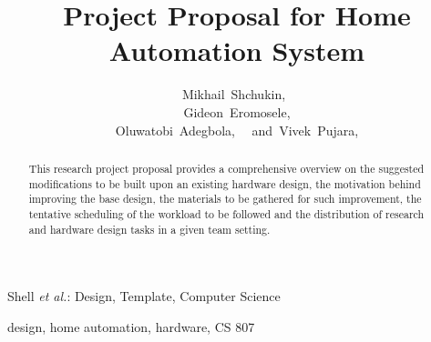 \documentclass[journal]{IEEEtran}
\begin{document}

\title{Project Proposal for Home Automation System}

\author{Mikhail~Shchukin,~
\\~Gideon~Eromosele,~
\\~Oluwatobi~Adegbola,~
~and~Vivek~Pujara,~
}


%
{Shell \MakeLowercase{\textit{et al.}}: Design, Template, Computer Science }


\maketitle

\begin{abstract}
This research project proposal provides a comprehensive overview on the
suggested modifications to be built upon an existing hardware design,
the motivation behind improving the base design, the materials
to be gathered for such improvement, the tentative scheduling of
the workload to be followed and the distribution of research and
hardware design tasks in a given team setting.
\end{abstract}

\begin{IEEEkeywords}
design, home automation, hardware, CS 807
\end{IEEEkeywords}



%
\IEEEpeerreviewmaketitle
\end{document}
